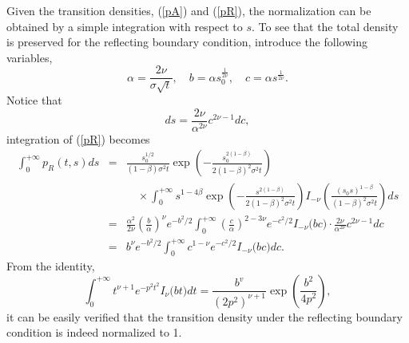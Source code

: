 \documentclass[12pt]{article}
\begin{document}
  Given the transition densities, (\ref{pA}) and (\ref{pR}), the normalization can be obtained by a simple integration with respect to $s$.
  To see that the total density is preserved for the reflecting boundary condition, introduce the following variables,
  \begin{equation}
    \alpha = \frac{2\nu}{\sigma\sqrt{t}},\quad b = \alpha s_0^{{\frac{1}{2\nu}}}, \quad c = \alpha s^{{\frac{1}{2\nu}}}.
  \end{equation}
  Notice that
  \begin{equation}
    ds=\frac{2\nu}{\alpha^{2\nu}}c^{2\nu-1}dc,
  \end{equation}
  integration of (\ref{pR}) becomes
  \begin{eqnarray}
      \int_0^{+\infty}p_R(t,s)ds
    &=&  \frac{s_0^{1/2}}{(1-\beta)\sigma^2t}
         \exp\left(-\frac{s_0^{2(1-\beta)}}{2(1-\beta)^2\sigma^2t}\right) \nonumber\\
      && \quad\times \int_0^{+\infty}s^{1-4\beta}\exp\left(-\frac{s^{2(1-\beta)}}{2(1-\beta)^2\sigma^2t}\right)
         I_{-\nu}\left(\frac{\left(s_0s\right)^{1-\beta}}{(1-\beta)^2\sigma^2t}\right)ds \nonumber\\
    &=&  \frac{\alpha^2}{2\nu}\left(\frac{b}{\alpha}\right)^{\nu}e^{-b^2/2}\int_0^{+\infty}\left(\frac{c}{\alpha}\right)^{2-3\nu}
         e^{-c^2/2}I_{-\nu}\bigg(bc\bigg)\cdot \frac{2\nu}{\alpha^{2\nu}}c^{2\nu-1}dc \nonumber\\
    &=&  b^{\nu}e^{-b^2/2}\int_0^{+\infty}c^{1-\nu}
         e^{-c^2/2}I_{-\nu}\bigg(bc\bigg)dc.
  \end{eqnarray}
  From the identity,
  \begin{equation}
    \int_0^{+\infty}t^{\nu+1}e^{-p^2t^2}I_{\nu}\bigg(bt\bigg)dt = \frac{b^v}{\left(2p^2\right)^{\nu+1}}\exp\left(\frac{b^2}{4p^2}\right),
  \end{equation}
  it can be easily verified that the transition density under the reflecting boundary condition is indeed normalized to 1.
\end{document}
